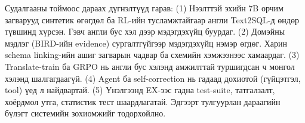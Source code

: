 Судалгааны тоймоос дараах дүгнэлтүүд гарав:
(1) Нээлттэй эхийн 7B орчим загварууд синтетик өгөгдөл ба RL-ийн тусламжтайгаар англи Text2SQL-д өндөр түвшинд
    хүрсэн. Гэвч англи бус хэл дээр мэдэгдэхүйц буурдаг.
(2) Домэйны мэдлэг (BIRD-ийн evidence) сургалтгүйгээр мэдэгдэхүйц нэмэр өгдөг. Харин schema linking-ийн ашиг загварын
    чадвар ба схемийн хэмжээнээс хамаардаг.
(3) Translate-train ба GRPO нь англи бус хэлэнд амжилттай туршигдсан ч монгол хэлэнд шалгагдаагүй.
(4) Agent ба self-correction нь гадаад дохиотой (гүйцэтгэл, tool) үед л найдвартай.
(5) Үнэлгээнд EX-ээс гадна test-suite, татгалзалт, хоёрдмол утга, статистик тест шаардлагатай.
Эдгээрт тулгуурлан дараагийн бүлэгт системийн зохиомжийг тодорхойлно.
